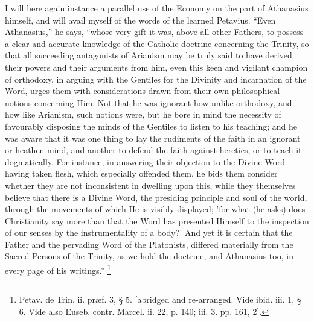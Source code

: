 I will here again instance a parallel use of the Economy on the
part of Athanasius himself, and will avail myself of the words of the
learned Petavius. ``Even Athanasius,'' he says, ``whose
very gift it was, above all other Fathers, to possess a clear and
accurate knowledge of the Catholic doctrine concerning the Trinity, so
that all succeeding antagonists of Arianism may be truly said to have
derived their powers and their arguments from him, even this keen
and vigilant champion of orthodoxy, in arguing with the Gentiles for
the Divinity and incarnation of the Word, urges them with
considerations drawn from their own philosophical notions concerning
Him. Not that he was ignorant how unlike orthodoxy, and how like
Arianism, such notions were, but he bore in mind the necessity of
favourably disposing the minds of the Gentiles to listen to his
teaching; and he was aware that it was one thing to lay the rudiments
of the faith in an ignorant or heathen mind, and another to defend the
faith against heretics, or to teach it dogmatically. For instance, in
answering their objection to the Divine Word having taken flesh, which
especially offended them, he bids them consider whether they are not
inconsistent in dwelling upon this, while they themselves believe that
there is a Divine Word, the presiding principle and soul of the world,
through the movements of which He is visibly displayed; 'for what (he
asks) does Christianity say more than that the Word has presented
Himself to the inspection of our senses by the instrumentality of a
body?' And yet it is certain that the Father and the pervading Word of
the Platonists, differed materially from the Sacred Persons of the
Trinity, as we hold the doctrine, and Athanasius too, in every page of
his writings.'' \footnote{Petav. de Trin. ii. præf. 3, § 5.
[abridged and re-arranged. Vide ibid. iii. 1, § 6. Vide also Euseb.
contr. Marcel. ii. 22, p. 140; iii. 3. pp. 161, 2].}

